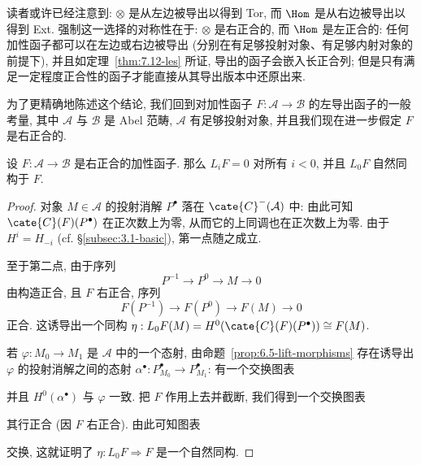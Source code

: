 读者或许已经注意到: $\otimes$ 是从左边被导出以得到 Tor, 而 $\Hom$ 是从右边被导出以得到 Ext. 强制这一选择的对称性在于: $\otimes$ 是右正合的, 而 $\Hom$ 是左正合的: 任何加性函子都可以在左边或右边被导出 (分别在有足够投射对象、有足够内射对象的前提下), 并且如定理~\ref{thm:7.12-les} 所证, 导出的函子会嵌入长正合列; 但是只有满足一定程度正合性的函子才能直接从其导出版本中还原出来.

为了更精确地陈述这个结论, 我们回到对加性函子 $F:\mathcal{A}\to\mathcal{B}$ 的左导出函子的一般考量, 其中 $\mathcal{A}$ 与 $\mathcal{B}$ 是 Abel 范畴, $\mathcal{A}$ 有足够投射对象, 并且我们现在进一步假定 $F$ 是右正合的.

\begin{proposition}\label{prop:7.13-right-exact}
设 $F:\mathcal{A}\to\mathcal{B}$ 是右正合的加性函子. 那么 $L_i F=0$ 对所有 $i<0$, 并且 $L_0 F$ 自然同构于 $F$.
\end{proposition}

\begin{proof}
对象 $M\in\mathcal{A}$ 的投射消解 $P^\bullet$ 落在 $\cate{C}^-(\mathcal{A})$ 中: 由此可知 $\cate{C}(F)(P^\bullet)$ 在正次数上为零, 从而它的上同调也在正次数上为零. 由于 $H^i=H_{-i}$ (cf. \S\ref{subsec:3.1-basic}), 第一点随之成立.

至于第二点, 由于序列
\[
P^{-1}\to P^0\to M\to 0
\]
由构造正合, 且 $F$ 右正合, 序列
\[
F(P^{-1})\to F(P^0)\to F(M)\to 0
\]
正合. 这诱导出一个同构 $\eta:L_0 F(M)=H^0(\cate{C}(F)(P^\bullet))\cong F(M)$.

若 $\varphi:M_0\to M_1$ 是 $\mathcal{A}$ 中的一个态射, 由命题~\ref{prop:6.5-lift-morphisms} 存在诱导出 $\varphi$ 的投射消解之间的态射 $\alpha^\bullet:P_{M_0}^\bullet\to P_{M_1}^\bullet$: 有一个交换图表
\begin{center}
\end{center}
并且 $H^0(\alpha^\bullet)$ 与 $\varphi$ 一致. 把 $F$ 作用上去并截断, 我们得到一个交换图表
\begin{center}
\end{center}
其行正合 (因 $F$ 右正合). 由此可知图表
\begin{center}
\end{center}
交换, 这就证明了 $\eta:L_0 F\Rightarrow F$ 是一个自然同构.
\end{proof}

